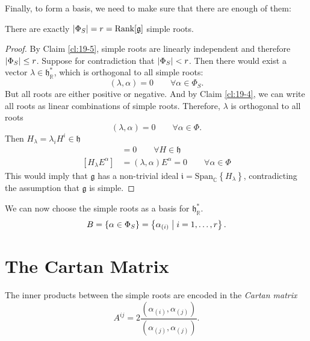 Finally, to form a basis, we need to make sure that there are enough of them:
\begin{claim}
  There are exactly $\abs{\Phi_S} = r = \text{Rank}[\mathfrak{g}]$ simple roots.
\end{claim}
\begin{proof}
  By Claim \ref{cl:19-5}, simple roots are linearly independent and therefore $\abs{\Phi_S} \leq r$.
  Suppose for contradiction that $\abs{\Phi_S} < r$. Then there would exist a vector $\lambda \in \mathfrak{h}^*_\mathbb{R}$, which is orthogonal to all simple roots:
  \begin{equation}
    (\lambda, \alpha) = 0 \qquad \forall \alpha \in \Phi_S.
  \end{equation}
  But all roots are either positive or negative. And by Claim \ref{cl:19-4}, we can write all roots as linear combinations of simple roots. Therefore, $\lambda$ is orthogonal to all roots
  \begin{equation}
    (\lambda, \alpha) = 0 \qquad \forall \alpha \in \Phi.
  \end{equation}
  Then $H_{\lambda} = \lambda_{i} H^{i} \in \mathfrak{h}$
  \begin{align}
    [H_{\lambda}, H] &= 0 \qquad \forall H \in \mathfrak{h} \\
    [H_{\lambda} E^{\alpha}] &= (\lambda, \alpha) E^{\alpha}  = 0 \qquad \forall \alpha \in \Phi
  \end{align}
  This would imply that $\mathfrak{g}$ has a non-trivial ideal $\mathfrak{i} = \text{Span}_{\mathbb{C}}\left\{H_{\lambda}\right\}$, contradicting the assumption that $\mathfrak{g}$ is simple.
\end{proof}

\begin{corollary}
  We can now choose the simple roots as a basis for $\mathfrak{h}^*_{\mathbb{R}}$.
  \begin{equation}
    B = \left\{ \alpha \in \Phi_S \right\} = \left\{ \alpha_{(i)} \suchthat i = 1, \dots, r \right\}.
  \end{equation}
\end{corollary}

\section{The Cartan Matrix}%
\label{sec:the_cartan_matrix}

\begin{definition}[]
  The inner products between the simple roots are encoded in the \emph{Cartan matrix}
  \begin{equation}
    \label{eq:cartan-matrix}
    A^{ij} = 2\frac{(\alpha_{(i)}, \alpha_{(j)})}{(\alpha_{(j)}, \alpha_{(j)})}.
  \end{equation}
\end{definition}

